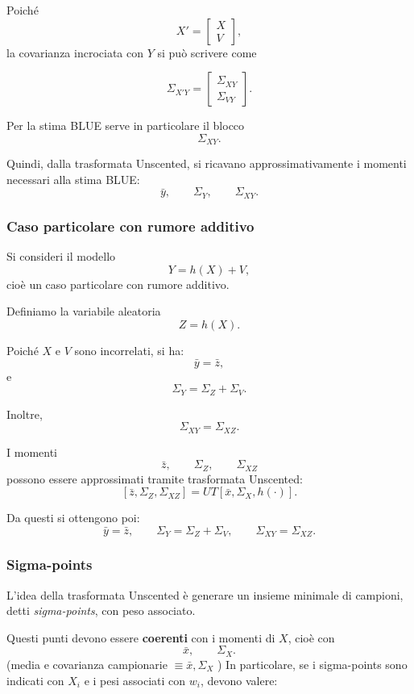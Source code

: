 \documentclass[11pt,a4paper]{article}
\begin{document}
Poiché
\[
X'=
\begin{bmatrix}
X\\
V
\end{bmatrix},
\]
la covarianza incrociata con \(Y\) si può scrivere come

\[
\Sigma_{X'Y}
=
\begin{bmatrix}
\Sigma_{XY}\\
\Sigma_{VY}
\end{bmatrix}.
\]

Per la stima BLUE serve in particolare il blocco
\[
\Sigma_{XY}.
\]

Quindi, dalla trasformata Unscented, si ricavano approssimativamente i momenti necessari alla stima BLUE:
\[
\bar y,\qquad \Sigma_Y,\qquad \Sigma_{XY}.
\]


\subsubsection*{Caso particolare con rumore additivo}

Si consideri il modello
\[
Y=h(X)+V,
\]
cioè un caso particolare con rumore additivo.

Definiamo la variabile aleatoria
\[
Z=h(X).
\]

Poiché \(X\) e \(V\) sono incorrelati, si ha:
\[
\bar y=\bar z,
\]
e
\[
\Sigma_Y=\Sigma_Z+\Sigma_V.
\]

Inoltre,
\[
\Sigma_{XY}=\Sigma_{XZ}.
\]

I momenti
\[
\bar z,\qquad \Sigma_Z,\qquad \Sigma_{XZ}
\]
possono essere approssimati tramite trasformata Unscented:
\[
[\bar z,\Sigma_Z,\Sigma_{XZ}]
=
UT[\bar x,\Sigma_X,h(\cdot)].
\]

Da questi si ottengono poi:
\[
\bar y=\bar z,
\qquad
\Sigma_Y=\Sigma_Z+\Sigma_V,
\qquad
\Sigma_{XY}=\Sigma_{XZ}.
\]

\subsubsection*{Sigma-points}

L'idea della trasformata Unscented è generare un insieme minimale di campioni, detti
\emph{sigma-points}, con peso associato.

Questi punti devono essere \textbf{coerenti} con i momenti di \(X\), cioè con
\[
\bar x,\qquad \Sigma_X.
\]
(media e covarianza campionarie $\equiv  \bar x, \Sigma_X$ )
In particolare, se i sigma-points sono indicati con \(X_i\) e i pesi associati con \(w_i\), devono valere:
\end{document}
